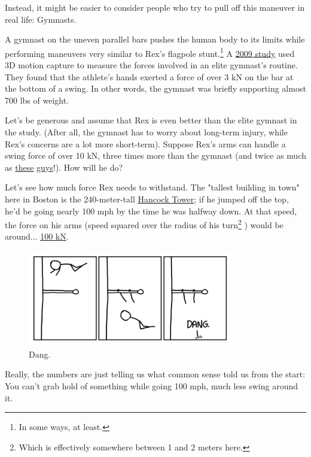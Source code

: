 {{Instead, it might be easier to consider people who try to pull off this maneuver in real life: Gymnasts.}

{A gymnast on the uneven parallel bars pushes the human body to its limits while performing maneuvers very similar to Rex's flagpole stunt.{\footnote{In some ways, at least.} } A \href{http://www.jbiomech.com/article/S0021-9290(09)00609-5/fulltext}{2009 study} used 3D motion capture to measure the forces involved in an elite gymnast's routine. They found that the athlete's hands exerted a force of over 3 kN on the bar at the bottom of a swing. In other words, the gymnast was briefly supporting almost 700 lbs of weight.}

{Let's be generous and assume that Rex is even better than the elite gymnast in the study. (After all, the gymnast has to worry about long-term injury, while Rex's concerns are a lot more short-term). Suppose Rex's arms can handle a swing force of over 10 kN, three times more than the gymnast (and twice as much as \href{https://www.youtube.com/watch?v=V1JBx2Mm9e8}{these} \href{https://www.youtube.com/watch?v=iJYOs5VFjwk} {guys}!). How will he do?}

{Let's see how much force Rex needs to withstand. The "tallest building in town" here in Boston is the 240-meter-tall \href{https://en.wikipedia.org/wiki/John\_Hancock\_Tower}{Hancock Tower}; if he jumped off the top, he'd be going nearly 100 mph by the time he was halfway down. At that speed, the force on his arms (speed squared over the radius of his turn{\footnote{Which is effectively somewhere between 1 and 2 meters here.} }) would be around... \href{http://www.wolframalpha.com/input/?i=100+lbs+*+(100+mph)\%5E2+\%2F+(1.5+meters)} {100 kN}.}

\begin{figure}[!htbp]
\centering
\includegraphics[scale=0.5, max width=0.8\textwidth]{imgs/a/133/nope.png}
\caption{Dang.}
\end{figure}

{Really, the numbers are just telling us what common sense told us from the start: You can't grab hold of something while going 100 mph, much less swing around it.}

}
